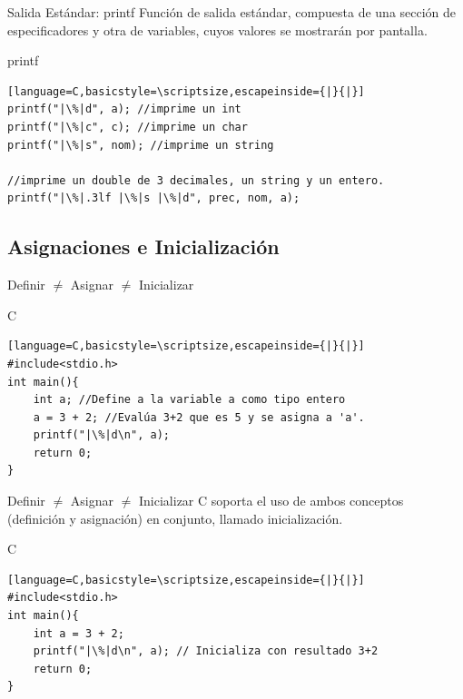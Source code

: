 \documentclass{beamer}
\begin{document}
\begin{frame}[fragile]{Salida Estándar: printf}
Función de salida estándar, compuesta de una sección de especificadores y otra de variables, cuyos valores se mostrarán por pantalla.

\begin{exampleblock}{printf}
\begin{lstlisting}[language=C,basicstyle=\scriptsize,escapeinside={|}{|}]
printf("|\%|d", a); //imprime un int
printf("|\%|c", c); //imprime un char
printf("|\%|s", nom); //imprime un string

//imprime un double de 3 decimales, un string y un entero.
printf("|\%|.3lf |\%|s |\%|d", prec, nom, a); 
\end{lstlisting}
\end{exampleblock}

\end{frame}


\subsection{Asignaciones e Inicialización}
\begin{frame}[fragile]{Definir $\neq$ Asignar $\neq$ Inicializar}
\begin{exampleblock}{C}
	\begin{lstlisting}[language=C,basicstyle=\scriptsize,escapeinside={|}{|}]
#include<stdio.h>
int main(){
	int a; //Define a la variable a como tipo entero
	a = 3 + 2; //Evalúa 3+2 que es 5 y se asigna a 'a'. 
	printf("|\%|d\n", a);
	return 0;
}
	\end{lstlisting}
\end{exampleblock}
\end{frame}
\begin{frame}[fragile]{Definir $\neq$ Asignar $\neq$ Inicializar}
\small C soporta el uso de ambos conceptos (definición y asignación) en conjunto, llamado inicialización.
\begin{exampleblock}{C}
	\begin{lstlisting}[language=C,basicstyle=\scriptsize,escapeinside={|}{|}]
#include<stdio.h>
int main(){
	int a = 3 + 2; 
	printf("|\%|d\n", a); // Inicializa con resultado 3+2
	return 0;
}
	\end{lstlisting}
\end{exampleblock}

\end{frame}
\end{document}
